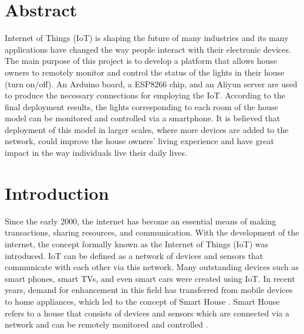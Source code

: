 \documentclass[a0,portrait]{a0poster}
\begin{document}
\vspace{0.5cm} %


\begin{multicols}{2} %


\color{Navy} %

\section*{Abstract}
\Large
Internet of Things (IoT) is shaping the future of many industries and its many applications have changed the way people interact with their electronic devices. The main purpose of this project is to develop a platform that allows house owners to remotely monitor and control the status of the lights in their house (turn on/off). An Arduino board, a ESP8266 chip, and an Aliyun server are used to produce the necessary connections for employing the IoT. According to the final deployment results, the lights corresponding to each room of the house model can be monitored and controlled via a smartphone. It is believed that deployment of this model in larger scales, where more devices are added to the network, could improve the house owners' living experience and have great impact in the way individuals live their daily lives.


\color{SaddleBrown} %

\section*{Introduction}
\Large
Since the early 2000, the internet has become an essential means of making transactions, sharing resources, and communication. With the development of the internet, the concept formally known as the Internet of Things (IoT) was introduced. IoT can be defined as a network of devices and sensors that communicate with each other via this network. Many outstanding devices such as smart phones, smart TVs, and even smart cars were created using IoT. In recent years, demand for enhancement in this field has transferred from mobile devices to home appliances, which led to the concept of Smart House \cite{lol}. Smart House refers to a house that consists of devices and sensors which are connected via a network and can be remotely monitored and controlled \cite{hehe}. 


\end{multicols}
\end{document}
